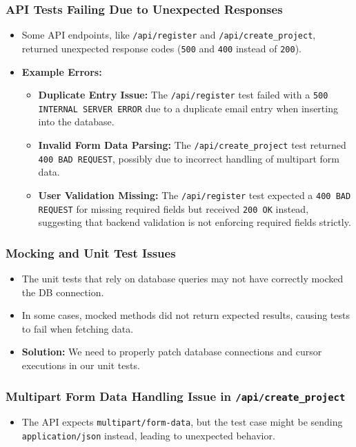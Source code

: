 \documentclass[12pt, titlepage]{article}
\begin{document}
\subsubsection{API Tests Failing Due to Unexpected Responses}
\begin{itemize}
    \item Some API endpoints, like \texttt{/api/register} and \texttt{/api/create\_project}, returned unexpected response codes (\texttt{500} and \texttt{400} instead of \texttt{200}).
    \item \textbf{Example Errors:}
    \begin{itemize}
        \item \textbf{Duplicate Entry Issue:} The \texttt{/api/register} test failed with a \texttt{500 INTERNAL SERVER ERROR} due to a duplicate email entry when inserting into the database.
        \item \textbf{Invalid Form Data Parsing:} The \texttt{/api/create\_project} test returned \texttt{400 BAD REQUEST}, possibly due to incorrect handling of multipart form data.
        \item \textbf{User Validation Missing:} The \texttt{/api/register} test expected a \texttt{400 BAD REQUEST} for missing required fields but received \texttt{200 OK} instead, suggesting that backend validation is not enforcing required fields strictly.
    \end{itemize}
\end{itemize}

\subsubsection{Mocking and Unit Test Issues}
\begin{itemize}
    \item The unit tests that rely on database queries may not have correctly mocked the DB connection.
    \item In some cases, mocked methods did not return expected results, causing tests to fail when fetching data.
    \item \textbf{Solution:} We need to properly patch database connections and cursor executions in our unit tests.
\end{itemize}

\subsubsection{Multipart Form Data Handling Issue in \texttt{/api/create\_project}}
\begin{itemize}
    \item The API expects \texttt{multipart/form-data}, but the test case might be sending \texttt{application/json} instead, leading to unexpected behavior.
\end{itemize}
\end{document}
